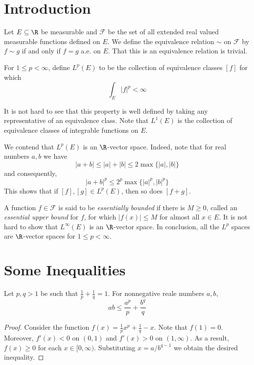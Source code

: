 \section{Introduction}

Let $E\subseteq\R$ be measurable and $\mathcal F$ be the set of all extended real valued measurable functions defined on $E$. We define the equivalence relation $\sim$ on $\mathcal F$ by $f\sim g$ if and only if $f = g$ a.e. on $E$. That this is an equivalence relation is trivial.

For $1\le p < \infty$, define $L^p(E)$ to be the collection of equivalence classes $[f]$ for which 
\begin{equation*}
    \int_E|f|^p < \infty
\end{equation*}

It is not hard to see that this property is well defined by taking any representative of an equivalence class. Note that $L^1(E)$ is the collection of equivalence classes of integrable functions on $E$.

We contend that $L^p(E)$ is an $\R$-vector space. Indeed, note that for real numbers $a,b$ we have 
\begin{equation*}
    |a + b|\le |a| + |b|\le 2\max\{|a|,|b|\}
\end{equation*}
and consequently, 
\begin{equation*}
    |a + b|^p\le 2^p\max\{|a|^p,|b|^p\}
\end{equation*}
This shows that if $[f],[g]\in L^p(E)$, then so does $[f + g]$.

A function $f\in\mathcal F$ is said to be \textit{essentially bounded} if there is $M\ge 0$, called an \textit{essential upper bound} for $f$, for which $|f(x)|\le M$ for almost all $x\in E$. It is not hard to show that $L^\infty(E)$ is an $\R$-vector space. In conclusion, all the $L^p$ spaces are $\R$-vector spaces for $1\le p < \infty$.

\section{Some Inequalities}

\begin{theorem}[Young]
    Let $p,q > 1$ be such that $\frac{1}{p} + \frac{1}{q} = 1$. For nonnegative reale numbers $a,b$, 
    \begin{equation*}
        ab\le\frac{a^p}{p} + \frac{b^q}{q}
    \end{equation*}
\end{theorem}
\begin{proof}
    Consider the function $f(x) = \frac{1}{p}x^p + \frac{1}{q} - x$. Note that $f(1) = 0$. Moreover, $f'(x) < 0$ on $(0,1)$ and $f'(x) > 0$ on $(1,\infty)$. As a result, $f(x)\ge 0$ for each $x\in[0,\infty)$. Substituting $x = a/b^{q - 1}$ we obtain the desired inequality.
\end{proof}

